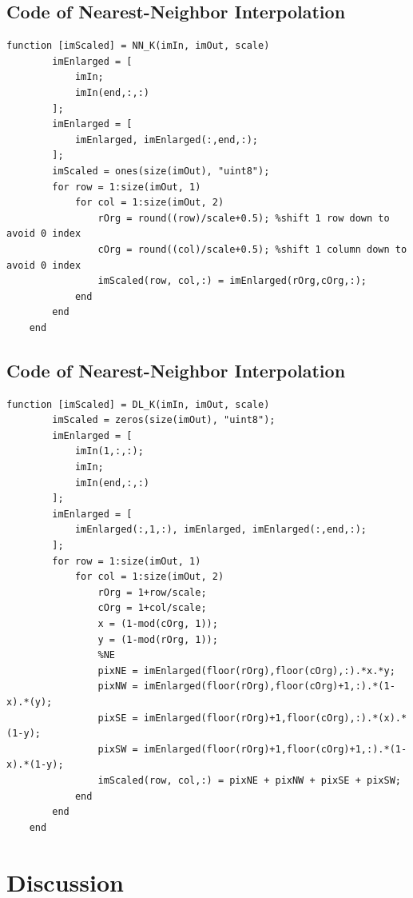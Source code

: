 \documentclass[a4paper,11pt]{article}
\begin{document}
\subsection{Code of Nearest-Neighbor Interpolation}
\lstset{language = Matlab}
    \begin{lstlisting}[basicstyle=\tiny]
    function [imScaled] = NN_K(imIn, imOut, scale)
        imEnlarged = [
            imIn;
            imIn(end,:,:)
        ];
        imEnlarged = [
            imEnlarged, imEnlarged(:,end,:);
        ];
        imScaled = ones(size(imOut), "uint8");
        for row = 1:size(imOut, 1)
            for col = 1:size(imOut, 2)
                rOrg = round((row)/scale+0.5); %shift 1 row down to avoid 0 index
                cOrg = round((col)/scale+0.5); %shift 1 column down to avoid 0 index
                imScaled(row, col,:) = imEnlarged(rOrg,cOrg,:);
            end
        end
    end
\end{lstlisting}

\subsection{Code of Nearest-Neighbor Interpolation}
\lstset{language = Matlab}
    \begin{lstlisting}[basicstyle=\tiny]
    function [imScaled] = DL_K(imIn, imOut, scale)
        imScaled = zeros(size(imOut), "uint8");
        imEnlarged = [
            imIn(1,:,:);
            imIn;
            imIn(end,:,:)
        ];
        imEnlarged = [
            imEnlarged(:,1,:), imEnlarged, imEnlarged(:,end,:);
        ];
        for row = 1:size(imOut, 1)
            for col = 1:size(imOut, 2)
                rOrg = 1+row/scale;
                cOrg = 1+col/scale;
                x = (1-mod(cOrg, 1));
                y = (1-mod(rOrg, 1));
                %NE
                pixNE = imEnlarged(floor(rOrg),floor(cOrg),:).*x.*y;
                pixNW = imEnlarged(floor(rOrg),floor(cOrg)+1,:).*(1-x).*(y);
                pixSE = imEnlarged(floor(rOrg)+1,floor(cOrg),:).*(x).*(1-y);
                pixSW = imEnlarged(floor(rOrg)+1,floor(cOrg)+1,:).*(1-x).*(1-y);
                imScaled(row, col,:) = pixNE + pixNW + pixSE + pixSW;
            end
        end
    end
\end{lstlisting}

\section{Discussion}
\end{document}
